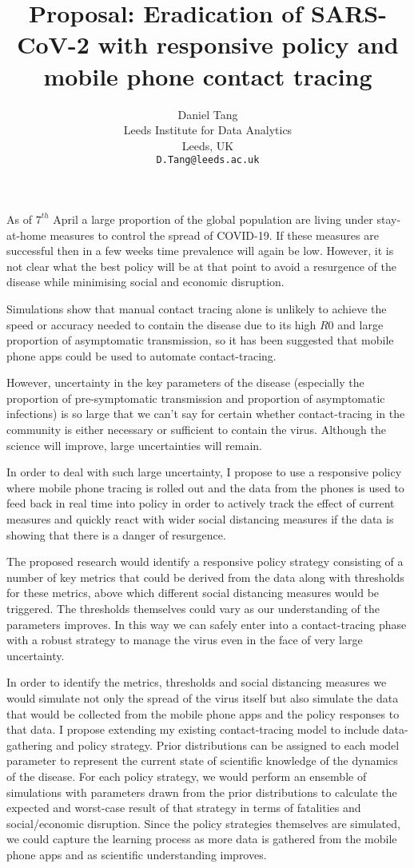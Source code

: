 \documentclass{article}
\title{Proposal: Eradication of SARS-CoV-2 with responsive policy and mobile phone contact tracing}
\date{} 					%
\author{
  Daniel Tang\\
  Leeds Institute for Data Analytics\\
  Leeds, UK\\
  \texttt{D.Tang@leeds.ac.uk} \\
}
\begin{document}
\maketitle

As of $7^{th}$ April a large proportion of the global population are living under stay-at-home measures to control the spread of COVID-19. If these measures are successful then in a few weeks time prevalence will again be low. However, it is not clear what the best policy will be at that point to avoid a resurgence of the disease while minimising social and economic disruption.

Simulations\cite{tang2020Contact}\cite{hellewellfeasibility}\cite{Ferrettieabb6936} show that manual contact tracing alone is unlikely to achieve the speed or accuracy needed to contain the disease due to its high $R0$ and large proportion of asymptomatic transmission, so it has been suggested that mobile phone apps could be used to automate contact-tracing.

However, uncertainty in the key parameters of the disease (especially the proportion of pre-symptomatic transmission and proportion of asymptomatic infections) is so large that we can't say for certain whether contact-tracing in the community is either necessary or sufficient to contain the virus. Although the science will improve, large uncertainties will remain.

In order to deal with such large uncertainty, I propose to use a responsive policy where mobile phone tracing is rolled out and the data from the phones is used to feed back in real time into policy in order to actively track the effect of current measures and quickly react with wider social distancing measures if the data is showing that there is a danger of resurgence.

The proposed research would identify a responsive policy strategy consisting of a number of key metrics that could be derived from the data along with thresholds for these metrics, above which different social distancing measures would be triggered. The thresholds themselves could vary as our understanding of the parameters improves. In this way we can safely enter into a contact-tracing phase with a robust strategy to manage the virus even in the face of very large uncertainty.

In order to identify the metrics, thresholds and social distancing measures we would simulate not only the spread of the virus itself but also simulate the data that would be collected from the mobile phone apps and the policy responses to that data. I propose extending my existing contact-tracing model\cite{tang2020Contact} to include data-gathering and policy strategy. Prior distributions can be assigned to each model parameter to represent the current state of scientific knowledge of the dynamics of the disease. For each policy strategy, we would perform an ensemble of simulations with parameters drawn from the prior distributions to calculate the expected and worst-case result of that strategy in terms of fatalities and social/economic disruption. Since the policy strategies themselves are simulated, we could capture the learning process as more data is gathered from the mobile phone apps and as scientific understanding improves.
\end{document}
